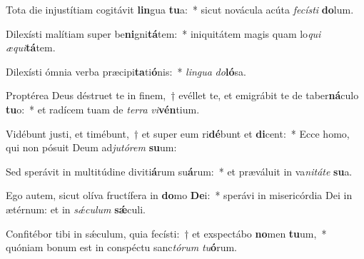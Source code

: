 \item Tota die injustítiam cogitávit \textbf{lin}gua \textbf{tu}a:~* sicut novácula acúta \textit{fe}\textit{cís}\textit{ti} \textbf{do}lum.
\item Dilexísti malítiam super be\textbf{ni}gni\textbf{tá}tem:~* iniquitátem magis quam lo\textit{qui} \textit{æ}\textit{qui}\textbf{tá}tem.
\item Dilexísti ómnia verba præcipi\textbf{ta}ti\textbf{ó}nis:~* \textit{lin}\textit{gua} \textit{do}\textbf{ló}sa.
\item Proptérea Deus déstruet te in finem,~† evéllet te, et emigrábit te de taber\textbf{ná}culo \textbf{tu}o:~* et radícem tuam de \textit{ter}\textit{ra} \textit{vi}\textbf{vén}tium.
\item Vidébunt justi, et timébunt,~† et super eum ri\textbf{dé}bunt et \textbf{di}cent:~* Ecce homo, qui non pósuit Deum ad\textit{ju}\textit{tó}\textit{rem} \textbf{su}um:
\item Sed sperávit in multitúdine diviti\textbf{á}rum su\textbf{á}rum:~* et præváluit in va\textit{ni}\textit{tá}\textit{te} \textbf{su}a.
\item Ego autem, sicut olíva fructífera in \textbf{do}mo \textbf{De}i:~* sperávi in misericórdia Dei in ætérnum: et in \textit{sǽ}\textit{cu}\textit{lum} \textbf{sǽ}culi.
\item Confitébor tibi in sǽculum, quia fecísti:~† et exspectábo \textbf{no}men \textbf{tu}um,~* quóniam bonum est in conspéctu sanc\textit{tó}\textit{rum} \textit{tu}\textbf{ó}rum.
